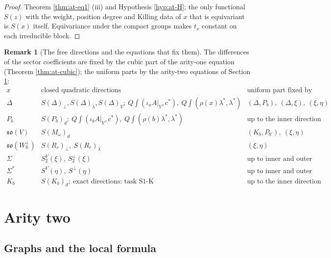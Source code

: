 \documentclass[11pt]{article}
\numberwithin{equation}{section}
\theoremstyle{plain}
\theoremstyle{definition}
\newtheorem{remark}[theorem]{Remark}
\newcommand{\AV}{A|_V}
\begin{document}
\begin{proof}
Theorem \ref{thm:at-eq1} (iii) and Hypothesis \ref{hyp:at-H}; the only functional $S(z)$ with the weight, position degree and Killing data of $x$ that is equivariant is $S(x)$ itself. Equivariance under the compact groups makes $t_x$ constant on each irreducible block.
\end{proof}

\begin{remark}[The free directions and the equations that fix them]
\label{rem:at-freetable}
The differences of the sector coefficients are fixed by the cubic part of the arity-one equation (Theorem \ref{thm:at-cubic}); the uniform parts by the arity-two equations of Section \ref{sec:at-ar2}:
\[
\begin{array}{l|l|l}
x & \text{closed quadratic directions} & \text{uniform part fixed by}\\
\hline
\Delta & S(\Delta)_\perp,S(\Delta)_\lambda,S(\Delta)_V;\ Q\int(\iota_x\AV,c^*),\ Q\int(\rho(x)\lambda^*,\lambda^*) & (\Delta,P_b),\ (\Delta,\xi),\ (\xi,\eta)\\
P_b & S(P_b)_d;\ Q\int(\iota_b\AV,c^*),\ Q\int(\rho(b)\lambda^*,\lambda^*) & \text{up to the inner direction}\\
\mathfrak{so}(V) & S(M_\omega)_d & (K_b,P_{b'}),\ (\xi,\eta)\\
\mathfrak{so}(W^\perp_{\mathbb R}) & S(R_r)_\perp,\ S(R_r)_\lambda & (\xi,\eta)\\
\Sigma & S^V_2(\xi),\ S^\perp_2(\xi) & \text{up to inner and outer}\\
\Sigma^* & S^V(\eta),\ S^\perp(\eta) & \text{up to inner and outer}\\
K_b & S(K_b)_d;\ \text{exact directions: task S1-K} & \text{up to the inner direction}
\end{array}
\]
\end{remark}

\section{Arity two}
\label{sec:at-ar2}

\subsection{Graphs and the local formula}
\end{document}
